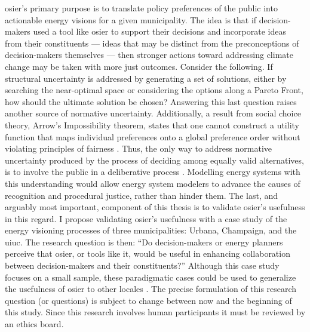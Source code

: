 \ac{osier}'s primary purpose is to translate policy preferences of the
public into actionable energy visions for a given municipality. The idea is
that if decision-makers used a tool like \ac{osier} to support their decisions
and incorporate ideas from their constituents --- ideas that may be distinct
from the preconceptions of decision-makers themselves --- then stronger actions
toward addressing climate change may be taken with more just outcomes. Consider
the following. If structural uncertainty is addressed by generating a set of
solutions, either by searching the near-optimal space or considering the options
along a Pareto Front, how should the ultimate solution be chosen? Answering this
last question raises another source of normative uncertainty. Additionally, a
result from social choice theory, Arrow's Impossibility theorem, states that one
cannot construct a utility function that maps individual preferences onto a
global preference order without violating principles of fairness
\cite{arrow_difficulty_1950, kasprzyk_many_2013,franssen_arrows_2005}. Thus, the
only way to address normative uncertainty produced by the process of deciding
among equally valid alternatives, is to involve the public in a deliberative
process \cite{dryzek_deliberative_2013}. Modelling energy systems with this
understanding would allow energy system modelers to advance the causes of
recognition and procedural justice, rather than hinder them. The last, and
arguably most important, component of this thesis is to validate \ac{osier}'s
usefulness in this regard. I propose validating \ac{osier}'s usefulness with a
case study of the energy visioning processes of three municipalities: Urbana,
Champaign, and the \ac{uiuc}. The research question is then: ``Do
decision-makers or energy planners perceive that \ac{osier}, or tools like it,
would be useful in enhancing collaboration between decision-makers and their
constituents?'' Although this case study focuses on a small sample, these
paradigmatic cases could be used to generalize the usefulness of \ac{osier} to
other locales \cite{flyvbjerg_five_2006}. The precise formulation of this
research question (or questions) is subject to change between now and the
beginning of this study. Since this research involves human participants it must
be reviewed by an ethics board.


